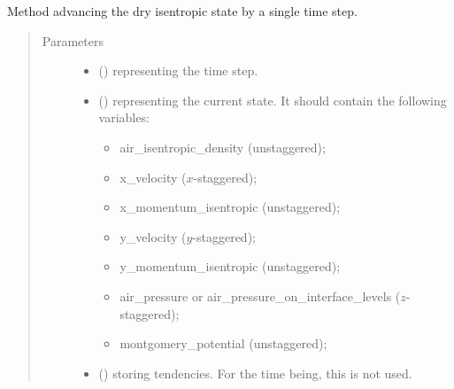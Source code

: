 \documentclass[letterpaper,10pt,english]{sphinxmanual}
\begin{document}
\begin{fulllineitems}
\begin{fulllineitems}
\end{fulllineitems}


\begin{fulllineitems}
\label{\detokenize{api:tasmania.dycore.dycore_isentropic.DynamicalCoreIsentropic._step_dry}}
Method advancing the dry isentropic state by a single time step.
\begin{quote}\begin{description}
\item[{Parameters}] \leavevmode\begin{itemize}
\item {} 
 () \textendash{}  representing the time step.

\item {} 
 () \textendash{} 
{\hyperref[\detokenize{api:tasmania.storages.state_isentropic.StateIsentropic}]{}} representing the current state.
It should contain the following variables:
\begin{itemize}
\item {} 
air\_isentropic\_density (unstaggered);

\item {} 
x\_velocity (\(x\)-staggered);

\item {} 
x\_momentum\_isentropic (unstaggered);

\item {} 
y\_velocity (\(y\)-staggered);

\item {} 
y\_momentum\_isentropic (unstaggered);

\item {} 
air\_pressure or air\_pressure\_on\_interface\_levels (\(z\)-staggered);

\item {} 
montgomery\_potential (unstaggered);

\end{itemize}


\item {} 
 () \textendash{} {\hyperref[\detokenize{api:tasmania.storages.grid_data.GridData}]{}} storing tendencies.
For the time being, this is not used.


\end{itemize}
\end{description}
\end{quote}
\end{fulllineitems}
\end{fulllineitems}
\end{document}
